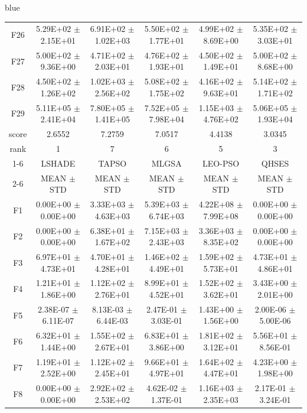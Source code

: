\documentclass[journal, onecolumn]{IEEEtran}
\begin{document}
\begin{color}{blue}
\begin{table}[htbp!]
\begin{tabular}{c|ccccc}
			F26	 &	5.29E+02	$\pm$	2.15E+01	 &	6.91E+02	$\pm$	1.02E+03		 &	5.50E+02	$\pm$	1.77E+01		 &	4.99E+02	$\pm$	8.69E+00		 &	5.35E+02	$\pm$	3.03E+01	\\	
			F27	 &	5.00E+02	$\pm$	9.36E+00	 &	4.71E+02	$\pm$	2.03E+01		 &	4.76E+02	$\pm$	1.93E+01		 &	4.50E+02	$\pm$	1.49E+01		 &	5.00E+02	$\pm$	8.68E+00	\\	
			F28	 &	4.50E+02	$\pm$	1.26E+02	 &	1.02E+03	$\pm$	2.56E+02		 &	5.08E+02	$\pm$	1.75E+02		 &	4.16E+02	$\pm$	9.63E+01		 &	5.14E+02	$\pm$	1.71E+02	\\	
			F29	 &	5.11E+05	$\pm$	2.41E+04	 &	7.80E+05	$\pm$	1.41E+05		 &	7.52E+05	$\pm$	7.98E+04		 &	1.15E+03	$\pm$	4.76E+02		 &	5.06E+05	$\pm$	1.93E+04	\\	\hline
			score		& 2.6552 & 7.2759 & 7.0517 & 4.4138 & 3.0345 											\\												
			rank	 	& 1 & 7 & 6 & 5 & 3 											\\	\cline{1-6}											
			&	LSHADE				 &	TAPSO				 &	MLGSA				 &	LEO-PSO				 &	QHSES			\\\cline{2-6}	
			&	MEAN	$\pm$	STD		 &	MEAN	$\pm$	STD		 &	MEAN	$\pm$	STD		 &	MEAN	$\pm$	STD		 &	MEAN	$\pm$	STD	\\\hline
			F1	 &	0.00E+00	$\pm$	0.00E+00		 &	3.33E+03	$\pm$	4.63E+03		 &	5.39E+03	$\pm$	6.74E+03		 &	4.22E+08	$\pm$	7.99E+08		 &	0.00E+00	$\pm$	0.00E+00	\\
			F2	 &	0.00E+00	$\pm$	0.00E+00		 &	6.38E+01	$\pm$	1.67E+02		 &	7.15E+03	$\pm$	2.43E+03		 &	3.36E+03	$\pm$	8.35E+02		 &	0.00E+00	$\pm$	0.00E+00	\\
			F3	 &	6.97E+01	$\pm$	4.73E+01		 &	4.70E+01	$\pm$	4.28E+01		 &	1.46E+02	$\pm$	4.49E+01		 &	1.59E+02	$\pm$	5.73E+01		 &	4.73E+01	$\pm$	4.86E+01	\\
			F4	 &	1.21E+01	$\pm$	1.86E+00		 &	1.12E+02	$\pm$	2.76E+01		 &	8.99E+01	$\pm$	4.52E+01		 &	1.52E+02	$\pm$	3.62E+01		 &	3.43E+00	$\pm$	2.01E+00	\\
			F5	 &	2.38E-07	$\pm$	6.11E-07		 &	8.13E-03	$\pm$	6.44E-03		 &	2.47E-01	$\pm$	3.03E-01		 &	1.43E+00	$\pm$	1.56E+00		 &	2.00E-06	$\pm$	5.00E-06	\\
			F6	 &	6.32E+01	$\pm$	1.44E+00		 &	1.55E+02	$\pm$	2.67E+01		 &	6.83E+01	$\pm$	3.86E+00		 &	1.81E+02	$\pm$	3.12E+01		 &	5.56E+01	$\pm$	8.56E-01	\\
			F7	 &	1.19E+01	$\pm$	2.52E+00		 &	1.12E+02	$\pm$	2.45E+01		 &	9.66E+01	$\pm$	4.97E+01		 &	1.64E+02	$\pm$	4.47E+01		 &	4.23E+00	$\pm$	1.98E+00	\\
			F8	 &	0.00E+00	$\pm$	0.00E+00		 &	2.92E+02	$\pm$	2.53E+02		 &	4.62E-02	$\pm$	1.37E-01		 &	1.16E+03	$\pm$	2.35E+03		 &	2.17E-01	$\pm$	3.24E-01	\\

\end{tabular}
\end{table}
\end{color}
\end{document}
